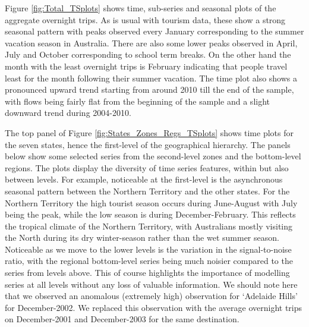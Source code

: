 \documentclass[12pt]{article}
\theoremstyle{definition}
\begin{document}
Figure \ref{fig:Total_TSplots} shows time, sub-series and seasonal plots of the aggregate overnight trips. As is usual with tourism data, these show a strong seasonal pattern with peaks observed every January corresponding to the summer vacation season in Australia. There are also some lower peaks observed in April, July and October corresponding to school term breaks. On the other hand the month with the least overnight trips is February indicating that people travel least for the month following their summer vacation. The time plot also shows a pronounced upward trend starting from around 2010 till the end of the sample, with flows being fairly flat from the beginning of the sample and a slight downward trend during 2004-2010.

The top panel of Figure \ref{fig:States_Zones_Regs_TSplots} shows time plots for the seven states, hence the first-level of the geographical hierarchy. The panels below show some selected series from the second-level zones and the bottom-level regions. The plots display the diversity of time series features, within but also between levels. For example, noticeable at the first-level is the asynchronous seasonal pattern between the Northern Territory and the other states. For the Northern Territory the high tourist season occurs during June-August with July being the peak, while the low season is during December-February. This reflects the tropical climate of the Northern Territory, with Australians mostly visiting the North during its dry winter-season rather than the wet summer season. Noticeable as we move to the lower levels is the variation in the signal-to-noise ratio, with the regional bottom-level series being much noisier compared to the series from levels above. This of course highlights the importance of modelling series at all levels without any loss of valuable information. We should note here that we observed an anomalous (extremely high) observation for `Adelaide Hills' for December-2002. We replaced this observation with the average overnight trips on December-2001 and December-2003 for the same destination.
		
\end{document}
